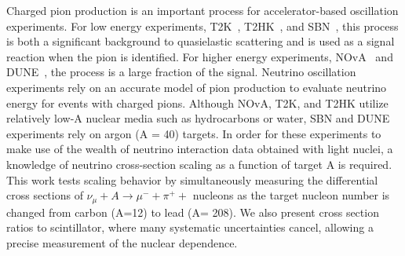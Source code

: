 \documentclass[aps,preprint,showpacs,superscriptaddress,letterpaper,showkeys,superscriptaddress,nofootinbib,floatfix]{revtex4-1}
\newcommand{\firstReviewAdd}[1]{{\bf\color{blue} \protect #1}}
\newcommand{\firstReviewStrike}[1]{{\bf\color{blue}\protect \sout{#1}}}
\newcommand{\firstRefereeAdd}[1]{{\bf\color{green} \protect #1}}
\newcommand{\firstRefereeStrike}[1]{{\bf\color{green}\protect \sout{#1}}}
\renewcommand{\firstReviewAdd}[1]{\protect #1}
\renewcommand{\firstReviewStrike}[1]{}
\renewcommand{\firstRefereeAdd}[1]{\protect #1}
\renewcommand{\firstRefereeStrike}[1]{}
\begin{document}
Charged pion production is an important process for accelerator-based oscillation experiments.  For low energy experiments, T2K~\cite{T2K:2011qtm},  T2HK~\cite{Hyper-Kamiokande:2018ofw}, and SBN~\cite{MicroBooNE:2015bmn}, this process is both a significant background to quasielastic scattering and is used as a signal reaction when the pion is identified.  For higher energy experiments, NOvA~\cite{NOvA:2004blv} and DUNE~\cite{DUNE:2015lol}, the process is a large fraction of the signal\firstRefereeStrike{ reactions}.  \firstReviewStrike{Neutrino energy reconstruction in these experiments relies on relating the visible energy from the $\pi^\pm$ in the detector to its larger total energy.}
\firstReviewAdd{ Neutrino oscillation experiments rely on an accurate model of pion production} \firstReviewStrike{is one of the necessary ingredients }
to evaluate neutrino energy for events with charged pions. 
\firstReviewAdd{ Although NOvA, T2K, and T2HK utilize relatively low-A nuclear media such as hydrocarbons or water, SBN and DUNE experiments rely on argon (A = 40) targets.   In order for these 
\firstRefereeStrike{latter} experiments to make use of the wealth of neutrino interaction data obtained with light nuclei, a knowledge of neutrino cross-section scaling as a function of target A is required. This work \firstRefereeStrike{sheds first light on}\firstRefereeAdd{tests} scaling behavior by simultaneously \firstRefereeStrike{mapping}\firstRefereeAdd{measuring} the differential cross sections of $\nu_\mu + A \to \mu^- + \pi^+ +$ nucleons as the target nucleon number is changed from carbon (A=12) to lead (A= 208).   We also present \firstReviewAdd{cross section} ratios \firstRefereeStrike{of the iron and lead targets} to scintillator, where many systematic uncertainties cancel, allowing a precise measurement of the nuclear dependence.  }


\end{document}
